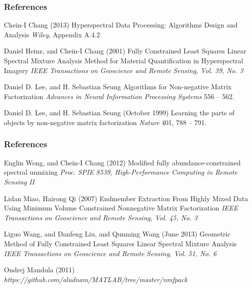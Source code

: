 \documentclass{beamer}
\begin{document}
\begin{frame}
\frametitle{References}
\footnotesize{
\begin{thebibliography}{99}

 Chein-I Chang (2013)
\newblock Hyperspectral Data Processing: Algorithms Design and Analysis
\newblock \emph{Wiley}, Appendix A.4.2

 Daniel Heinz, and Chein-I Chang (2001)
\newblock Fully Constrained Least Squares Linear Spectral Mixture Analysis Method for Material Quantification in Hyperspectral Imagery
\newblock \emph{IEEE Transactions on Geoscience and Remote Sensing, Vol. 39, No. 3}

 Daniel D. Lee, and H. Sebastian Seung
\newblock Algorithms for Non-negative Matrix Factorization
\newblock \emph{Advances in Neural Information Processing Systems} 556 -- 562.

 Daniel D. Lee, and H. Sebastian Seung (October 1999)
\newblock Learning the parts of objects by non-negative matrix factorization
\newblock \emph{Nature} 401, 788 -- 791.

\end{thebibliography}
}
\end{frame}

\begin{frame}
\frametitle{References}
\footnotesize{
\begin{thebibliography}{99}

 Englin Wong, and Chein-I Chang (2012)
\newblock Modified fully abundance-constrained spectral unmixing
\newblock \emph{Proc. SPIE 8539, High-Performance Computing in Remote Sensing II}

 Lidan Miao, Hairong Qi (2007)
\newblock Endmember Extraction From Highly Mixed Data Using Minimum Volume Constrained Nonnegative Matrix Factorization
\newblock \emph{IEEE Transactions on Geoscience and Remote Sensing, Vol. 45, No. 3}

 Liguo Wang, and Danfeng Liu, and Qunming Wang (June 2013)
\newblock Geometric Method of Fully Constrained Least Squares Linear Spectral Mixture Analysis
\newblock \emph{IEEE Transactions on Geoscience and Remote Sensing, Vol. 51, No. 6}

 Ondrej Mandula (2011)
\newblock \emph{https://github.com/aludnam/MATLAB/tree/master/nmfpack}

\end{thebibliography}
}
\end{frame}
\end{document}
